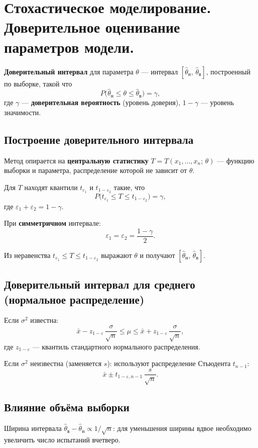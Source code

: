 \section{Стохастическое моделирование. Доверительное оценивание параметров модели.}

\textbf{Доверительный интервал} для параметра $\theta$ — интервал $[\hat{\theta}_\text{н},\, \hat{\theta}_\text{в}]$, построенный по выборке, такой что
\[
  P\bigl(\hat{\theta}_\text{н} \leqslant \theta \leqslant \hat{\theta}_\text{в}\bigr) = \gamma,
\]
где $\gamma$ — \textbf{доверительная вероятность} (уровень доверия), $1-\gamma$ — уровень значимости.

\subsection*{Построение доверительного интервала}

Метод опирается на \textbf{центральную статистику} $T = T(x_1,\ldots,x_n;\,\theta)$ — функцию выборки и параметра, распределение которой не зависит от $\theta$.

Для $T$ находят квантили $t_{\varepsilon_1}$ и $t_{1-\varepsilon_2}$ такие, что
\[
  P\bigl(t_{\varepsilon_1} \leqslant T \leqslant t_{1-\varepsilon_2}\bigr) = \gamma,
\]
где $\varepsilon_1 + \varepsilon_2 = 1 - \gamma$.

При \textbf{симметричном} интервале:
\[
  \varepsilon_1 = \varepsilon_2 = \frac{1-\gamma}{2}.
\]

Из неравенства $t_{\varepsilon_1} \leqslant T \leqslant t_{1-\varepsilon_2}$ выражают $\theta$ и получают $[\hat{\theta}_\text{н},\, \hat{\theta}_\text{в}]$.

\subsection*{Доверительный интервал для среднего (нормальное распределение)}

Если $\sigma^2$ известна:
\[
  \bar{x} - z_{1-\varepsilon}\,\frac{\sigma}{\sqrt{n}} \leqslant \mu \leqslant \bar{x} + z_{1-\varepsilon}\,\frac{\sigma}{\sqrt{n}},
\]
где $z_{1-\varepsilon}$ — квантиль стандартного нормального распределения.

Если $\sigma^2$ неизвестна (заменяется $s$): используют распределение Стьюдента $t_{n-1}$:
\[
  \bar{x} \pm t_{1-\varepsilon,n-1}\,\frac{s}{\sqrt{n}}.
\]

\subsection*{Влияние объёма выборки}

Ширина интервала $\hat{\theta}_\text{в} - \hat{\theta}_\text{н} \propto 1/\sqrt{n}$: для уменьшения ширины вдвое необходимо увеличить число испытаний вчетверо.

\clearpage

